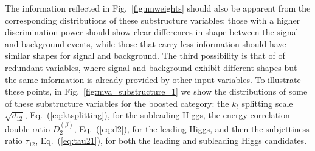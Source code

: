 The information reflected in Fig.~\ref{fig:nnweights} should also be
apparent from the corresponding distributions of these substructure
variables: those with a higher discrimination power should show
clear differences in shape between the signal and background events,
while those that carry less information should have similar
shapes for signal and background.
%
The third possibility is that of of redundant variables, where signal
and background exhibit different shapes but the same information
is already provided by other input variables.
%
To illustrate these points,
in Fig.~\ref{fig:mva_substructure_1}
we show the distributions of some of
these substructure variables for the boosted category: the
$k_t$ splitting scale $\sqrt{d_{12}}$, Eq.~(\ref{eq:ktsplitting}), for
the subleading Higgs,
the energy correlation double ratio $D_2^{(\beta)}$,
Eq.~(\ref{eq:d2}), for the leading Higgs,
and then 
the subjettiness ratio $\tau_{12}$,
Eq.~(\ref{eq:tau21}),
for both the leading and subleading Higgs candidates.
%

